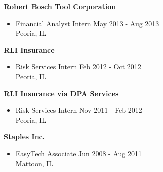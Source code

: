 \documentclass[11pt]{article}
\newenvironment{innerlist}[1][\enskip\textbullet]%
        {\begin{itemize}[#1,leftmargin=*,parsep=0pt,itemsep=0pt,topsep=0pt,partopsep=0pt]}
        {\end{itemize}}
\newcommand{\halfblankline}{\quad\vspace{-0.5\baselineskip}\pagebreak[3]}
\begin{document}
\halfblankline

\textbf{Robert Bosch Tool Corporation}
\begin{innerlist}
\item[] Financial Analyst Intern \hfill May 2013 - Aug 2013\\
Peoria, IL 
\end{innerlist}

\halfblankline

\textbf{RLI Insurance}
\begin{innerlist}
\item[] Risk Services Intern \hfill Feb 2012 - Oct 2012\\
Peoria, IL 
\end{innerlist}

\halfblankline

\textbf{RLI Insurance via DPA Services}
\begin{innerlist}
\item[] Risk Services Intern \hfill Nov 2011 - Feb 2012\\
Peoria, IL 
\end{innerlist}

\halfblankline

\textbf{Staples Inc.}
\begin{innerlist}
\item[] EasyTech Associate \hfill Jun 2008 - Aug 2011 \\
Mattoon, IL 
\end{innerlist}
\end{document}
